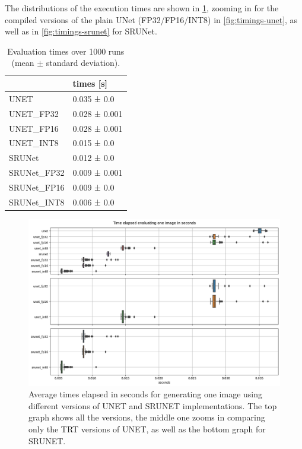 The distributions of the execution times are shown in \cref{fig:timings-all}, zooming in for the compiled versions of the plain UNet (FP32/FP16/INT8) in \cref{fig:timings-unet}, as well as in \cref{fig:timings-srunet} for SRUNet.

\begin{table}[t]
\begin{tabular}{ll}
\toprule
{} &      times [s] \\
\midrule
UNET        &    0.035 ± 0.0 \\
UNET\_FP32   &  0.028 ± 0.001 \\
UNET\_FP16   &  0.028 ± 0.001 \\
UNET\_INT8   &    0.015 ± 0.0 \\
SRUNet      &    0.012 ± 0.0 \\
SRUNet\_FP32 &  0.009 ± 0.001 \\
SRUNet\_FP16 &    0.009 ± 0.0 \\
SRUNet\_INT8 &    0.006 ± 0.0 \\
\bottomrule
\end{tabular}
\caption{Evaluation times over 1000 runs (mean $\pm$ standard deviation).}
\label{tab:timings}
\end{table}

\begin{figure}[h]
  \includegraphics[width=1.0\textwidth]{static/2023_03_02_boxplots_timings_all.png}
  \caption{Average times elapsed in seconds for generating one image using different versions of UNET and SRUNET implementations. The top graph shows all the versions, the middle one zooms in comparing only the TRT versions of UNET, as well as the bottom graph for SRUNET.}
\label{fig:timings-all}
\end{figure}

